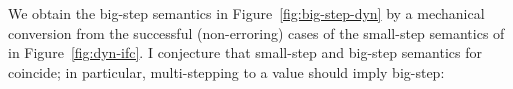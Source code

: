 
We obtain the big-step semantics in Figure~\ref{fig:big-step-dyn} by a
mechanical conversion from the successful (non-erroring) cases of the small-step
semantics of \DynIFC in Figure~\ref{fig:dyn-ifc}. I conjecture that small-step
and big-step semantics for \DynIFC coincide; in particular, multi-stepping to a
value should imply big-step:

